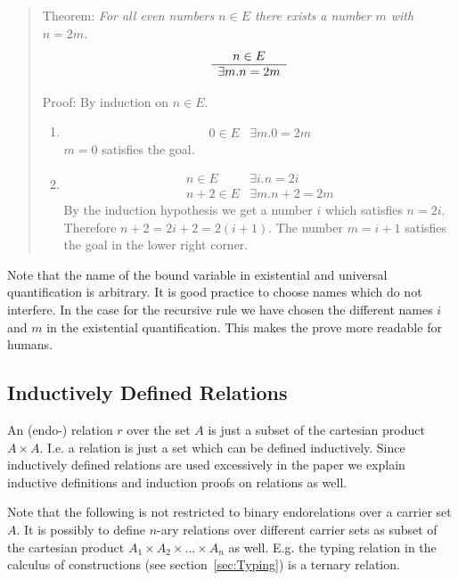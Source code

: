 \begin{quote}
    Theorem: \emph{For all even numbers $n \in E$ there exists a number $m$ with
    $n = 2m$}.
    $$
    \begin{array}{c} n \in E \\ \hline \exists m. n = 2m\end{array}
    $$

    Proof: By induction on $n \in E$.
    \begin{enumerate}
    \item
        $$
        \begin{array}{l|l}
        0 \in E
        & \exists m. 0 = 2m
        \end{array}
        $$
        $m = 0$ satisfies the goal.

    \item
        $$
        \begin{array}{l|l}
            n \in E
            &
            \exists i. n = 2i
            \\
            \hline
            n+2 \in E
            &
            \exists m. n+2 = 2m
        \end{array}
        $$
        By the induction hypothesis we get a number $i$ which satisfies $n =
        2i$. Therefore $n+2 = 2i + 2 = 2(i+1)$. The number $m = i+1$ satisfies
        the goal in the lower right corner.
    \end{enumerate}
\end{quote}


Note that the name of the bound variable in existential and universal
quantification is arbitrary. It is good practice to choose names which do not
interfere. In the case for the recursive rule we have chosen the different names
$i$ and $m$ in the existential quantification. This makes the prove more
readable for humans.




\subsection{Inductively Defined Relations}

An (endo-) relation $r$ over the set $A$ is just a subset of the cartesian
product $A \times A$. I.e. a relation is just a set which can be defined
inductively. Since inductively defined relations are used excessively in the
paper we explain inductive definitions and induction proofs on relations as
well.

Note that the following is not restricted to binary endorelations over a carrier
set $A$. It is possibly to define $n$-ary relations over different carrier sets
as subset of the cartesian product $A_1 \times A_2 \times \ldots \times A_n$ as
well. E.g. the typing relation in the calculus of constructions (see
section~\ref{sec:Typing}) is a ternary relation.

